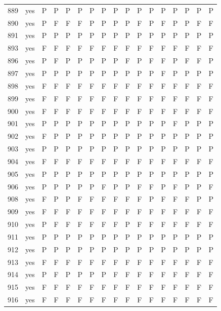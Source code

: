 \begin{table}[p]
\begin{tabular*}{\textwidth}{@{\extracolsep{\fill}}rcccccccccccccccc}
889 & yes & P & P & P & P & P & P & P & P & P & P & P & P & P & P & P\\
890 & yes & P & F & F & F & P & P & P & P & F & P & F & P & P & F & F\\
891 & yes & P & P & P & P & P & P & P & P & P & P & P & P & P & P & P\\
893 & yes & F & F & F & F & F & F & F & F & F & F & F & F & F & F & F\\
896 & yes & P & F & P & P & P & P & P & F & P & F & F & P & F & F & P\\
897 & yes & P & P & P & P & P & P & P & P & P & P & F & P & P & P & P\\
898 & yes & F & F & F & F & F & F & F & F & F & F & F & F & F & F & F\\
899 & yes & F & F & F & F & F & F & F & F & F & F & F & F & F & F & F\\
900 & yes & F & F & F & F & F & F & F & F & F & F & F & F & F & F & F\\
901 & yes & P & P & P & P & P & P & P & P & P & P & P & F & P & P & P\\
902 & yes & F & P & P & P & P & P & P & P & P & P & P & P & P & P & P\\
903 & yes & P & P & P & P & P & P & P & P & P & P & P & P & P & P & P\\
904 & yes & F & F & F & F & F & F & F & F & F & F & F & F & F & F & F\\
905 & yes & P & P & P & P & P & P & P & P & P & P & P & P & P & P & P\\
906 & yes & P & P & P & P & P & F & P & P & F & F & P & F & P & P & F\\
908 & yes & F & P & P & F & F & F & F & F & F & P & F & F & F & P & P\\
909 & yes & F & F & F & F & F & F & F & F & F & F & F & F & F & F & F\\
910 & yes & P & F & F & F & F & F & F & P & F & F & F & F & F & F & F\\
911 & yes & P & P & P & P & P & P & P & P & P & P & P & P & P & P & P\\
912 & yes & P & P & P & P & P & P & P & P & P & P & P & P & P & P & P\\
913 & yes & F & F & F & F & F & F & F & F & F & F & F & F & F & F & F\\
914 & yes & P & F & P & P & P & P & F & F & F & F & F & F & F & F & F\\
915 & yes & F & F & F & F & F & F & F & F & F & F & F & F & F & F & F\\
916 & yes & F & F & F & F & F & F & F & F & F & F & F & F & F & F & F\\
\bottomrule\end{tabular*}\end{table}
\clearpage


